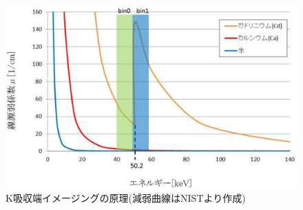 \begin{figure}[H]
 \begin{center}
 \includegraphics[width=12cm]{image/other/k-edge.eps}
 \end{center}
 \vspace{-0.7cm}
 \caption{K吸収端イメージングの原理(減弱曲線はNISTより作成)}
 \label{fig:k-edge}
\end{figure}









